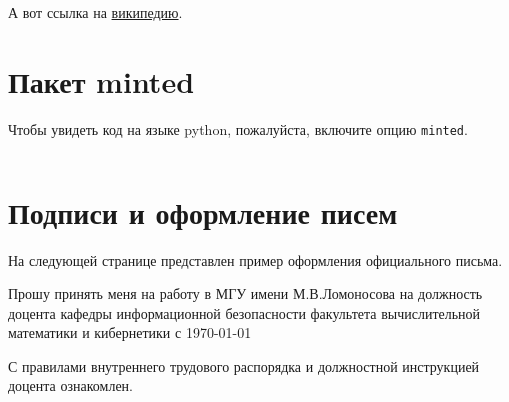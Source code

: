 \documentclass[colorthm]{../civarticle}
\begin{document}
А вот ссылка на \href{https://ru.wikipedia.org}{википедию}.


\section{Пакет minted}
\label{sec:minted}

Чтобы увидеть код на языке python, пожалуйста, включите опцию \texttt{minted}.
\if \MINTED\empty
\else \inputminted{python}{code.py} \fi

\section{Подписи и оформление писем}\label{sec:example:sign}
На следующей странице представлен пример оформления официального
письма.

\newpage
\thispagestyle{empty}  %


\vspace{6\bigskipamount}


\vspace{3\bigskipamount}

\begin{spacing}{2} %
  \large Прошу принять меня на работу в МГУ имени М.В.Ломоносова на
  должность доцента кафедры информационной безопасности факультета
  вычислительной математики и кибернетики с \today

  С правилами внутреннего трудового распорядка и должностной
  инструкцией доцента ознакомлен.
\end{spacing}

\medskip


\vspace{4\bigskipamount}


\vspace{3\bigskipamount}

\newpage
\end{document}
